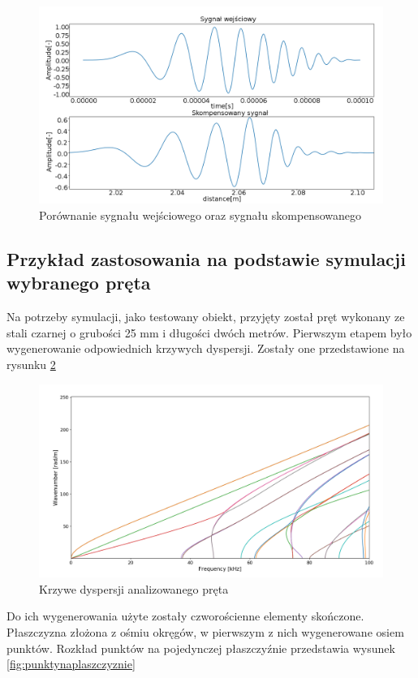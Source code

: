 \begin{figure}[h]
\centering
\includegraphics[width=14cm]{Zdjecia/4/Wilcoxporownanie}
\caption{Porównanie sygnału wejściowego oraz sygnału skompensowanego}
\label{fig:willast}
\end{figure}

\subsection{Przykład zastosowania na podstawie symulacji wybranego pręta}

Na potrzeby symulacji, jako testowany obiekt, przyjęty został pręt wykonany ze stali czarnej o grubości 25 mm i długości dwóch metrów. Pierwszym etapem było wygenerowanie odpowiednich krzywych dyspersji. Zostały one przedstawione na rysunku \ref{fig:krzywestalowe}
\begin{figure}[h]
\centering
\includegraphics[width=14cm]{Zdjecia/4/krzywestalowe}
\caption{Krzywe dyspersji analizowanego pręta}
\label{fig:krzywestalowe}
\end{figure}

Do ich wygenerowania użyte zostały czworościenne elementy skończone. Płaszczyzna złożona z ośmiu okręgów, w pierwszym z nich wygenerowane osiem punktów. Rozkład punktów na pojedynczej płaszczyźnie przedstawia wysunek \ref{fig:punktynaplaszczyznie}

